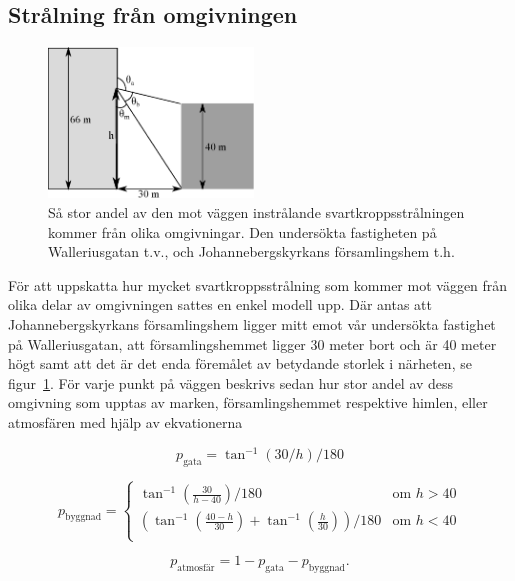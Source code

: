 \subsection{Strålning från omgivningen}
\label{sec:bb_sur}

\begin{figure}[hpbt]
\centering
\includegraphics[height=4cm]{images/blackbody_surroundings.eps}
\caption{\label{fig:surroundings}{Så stor andel av den mot väggen instrålande 
svartkroppsstrålningen kommer från olika omgivningar. Den undersökta fastigheten på 
Walleriusgatan t.v., och Johannebergskyrkans församlingshem t.h.}}
\end{figure}

För att uppskatta hur mycket svartkroppsstrålning som kommer mot väggen från olika 
delar av omgivningen sattes en enkel modell upp. Där antas att Johannebergskyrkans 
församlingshem ligger mitt emot vår undersökta fastighet på Walleriusgatan, att 
församlingshemmet ligger 30 meter bort och är 40 meter högt samt att det är det enda 
föremålet av betydande storlek i närheten, se figur~\ref{fig:surroundings}. För varje punkt
 på väggen beskrivs sedan hur stor andel av dess omgivning som upptas av marken, 
 församlingshemmet respektive himlen, eller atmosfären med hjälp av ekvationerna

\begin{equation}
p_\text{gata}=\tan^{-1}(30/h)/180
\end{equation}

\begin{equation}
p_\text{byggnad}= \left\{
\begin{array}{rl}
\tan^{-1}(\frac{30}{h-40})/180 & \text{om } h > 40 \\
(\tan^{-1}(\frac{40-h}{30})+\tan^{-1}(\frac{h}{30}))/180 & \text{om } h < 40 \\
\end{array} \right.
\end{equation}

\begin{equation}
p_\text{atmosfär}=1-p_\text{gata}-p_\text{byggnad}.
\end{equation}

